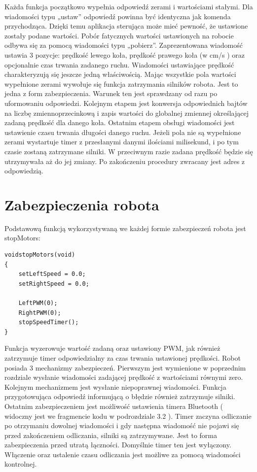 \documentclass[eng,printmode]{mgr}
\begin{document}
Każda funkcja początkowo wypełnia odpowiedź zerami i wartościami stałymi. Dla wiadomości typu „ustaw” odpowiedź powinna być identyczna jak komenda przychodząca. Dzięki temu aplikacja sterująca może mieć pewność, że ustawione zostały podane wartości. Pobór fatycznych wartości ustawionych na robocie odbywa się za pomocą wiadomości typu „pobierz”.  Zaprezentowana wiadomość ustawia 3 pozycje: prędkość lewego koła, prędkość prawego koła (w cm/s ) oraz opcjonalnie czas trwania zadanego ruchu. Wiadomości ustawiające prędkość charakteryzują się jeszcze jedną właściwością. Mając wszystkie pola wartości  wypełnione zerami wywołuje się funkcja zatrzymania silników robota. Jest to jedna z form zabezpieczenia. Warunek ten jest sprawdzany od razu po uformowaniu odpowiedzi. Kolejnym etapem jest konwersja odpowiednich bajtów na liczbę zmiennoprzecinkową i zapis wartości do globalnej zmiennej określającej zadaną prędkość dla danego koła. Ostatnim etapem obsługi wiadomości jest ustawienie czasu trwania długości danego ruchu. Jeżeli pola nie są wypełnione zerami wystartuje timer z przesłanymi danymi ilościami milisekund, i po tym czasie zostaną zatrzymane silniki. W przeciwnym razie zadana prędkość będzie się utrzymywała aż do jej zmiany. Po zakończeniu procedury zwracany jest adres z odpowiedzią.

 \section{Zabezpieczenia robota}

Podstawową funkcją wykorzystywaną we każdej formie zabezpieczeń robota jest stopMotors:
\begin{lstlisting}[style=c]
voidstopMotors(void)
{
	setLeftSpeed = 0.0;
	setRightSpeed = 0.0;

	LeftPWM(0);
	RightPWM(0);
	stopSpeedTimer();
}
\end{lstlisting}
Funkcja wyzerowuje wartość zadaną oraz ustawiony PWM, jak również zatrzymuje timer odpowiedzialny za czas trwania ustawionej prędkości. Robot posiada 3 mechanizmy zabezpieczeń. Pierwszym jest wymienione w poprzednim rozdziale wysłanie wiadomości zadającej prędkość z wartościami równymi zero. Kolejnym mechanizmem jest wysłanie niepoprawnej wiadomości. Funkcja przygotowująca odpowiedź informującą o błędzie również zatrzymuje silniki. Ostatnim zabezpieczeniem jest możliwość ustawienia timera Bluetooth ( widoczny jest we fragmencie kodu w podrozdziale 3.2 ). Timer zaczyna odliczanie po otrzymaniu dowolnej wiadomości i gdy następna wiadomość nie pojawi się przed zakończeniem odliczania, silniki są zatrzymywane. Jest to forma zabezpieczenia przed utratą łączności. Domyślnie timer ten jest wyłączony. Włączenie oraz ustalenie czasu odliczania jest możliwe za pomocą wiadomości kontrolnej.
\end{document}
